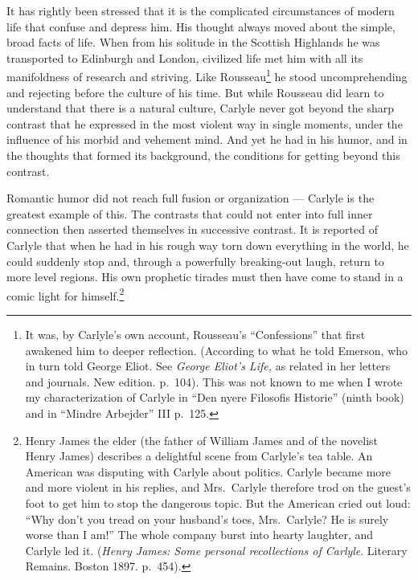 \documentclass[12pt]{book}
\newcommand{\opage}[1]{\marginnote{\footnotesize\textit{[#1]}}}
\begin{document}
It has rightly been stressed that it is the complicated circumstances of modern life that confuse and
depress him. His thought always moved about the simple, broad facts of life. When from his solitude
in the Scottish Highlands he was transported to Edinburgh and London, civilized life met him with all
its manifoldness of research and striving. Like Rousseau\footnote{It was, by Carlyle's own account,
Rousseau's ``Confessions'' that first awakened him to deeper reflection. (According to what he told
Emerson, who in turn told George Eliot. See \textit{George Eliot's Life,} as related in her letters
and journals. New edition. p.~104). This was not known to me when I wrote my characterization of
Carlyle in ``Den nyere Filosofis Historie'' (ninth book) and in ``Mindre Arbejder'' III p.~125.} he
stood uncomprehending and rejecting before the culture of his time. But while \opage{167}Rousseau did
learn to understand that there is a natural culture, Carlyle never got beyond the sharp contrast that
he expressed in the most violent way in single moments, under the influence of his morbid and vehement
mind. And yet he had in his humor, and in the thoughts that formed its background, the conditions for
getting beyond this contrast.

Romantic humor did not reach full fusion or organization --- Carlyle is the greatest example of this.
The contrasts that could not enter into full inner connection then asserted themselves in successive
contrast. It is reported of Carlyle that when he had in his rough way torn down everything in the
world, he could suddenly stop and, through a powerfully breaking-out laugh, return to more level
regions. His own prophetic tirades must then have come to stand in a comic light for
himself.\footnote{Henry James the elder (the father of William James and of the novelist Henry James)
describes a delightful scene from Carlyle's tea table. An American was disputing with Carlyle about
politics. Carlyle became more and more violent in his replies, and Mrs.\ Carlyle therefore trod on the
guest's foot to get him to stop the dangerous topic. But the American cried out loud: ``Why don't you
tread on your husband's toes, Mrs.\ Carlyle? He is surely worse than I am!'' The whole company burst
into hearty laughter, and Carlyle led it. (\textit{Henry James: Some personal recollections of
Carlyle}. Literary Remains. Boston 1897. p.~454).}
\end{document}
